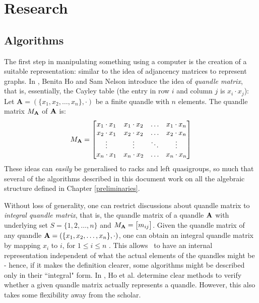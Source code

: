 \chapter{Research}\label{research}
\section{Algorithms}
\noindent The first step in manipulating something using a computer is the creation of a suitable representation: similar to the idea of adjancency matrices to represent graphs. In \cite{ho2005matrices}, Benita Ho and Sam Nelson introduce the idea of \emph{quandle matrix}, that is, essentially, the Cayley table (the entry in row $i$ and column $j$ is $x_i \cdot x_j$):
Let $\mathbf{A}=(\{x_1, x_2, \dots, x_n\}, \cdot)$ be a finite quandle with $n$ elements. \newline 
    The quandle matrix $M_\mathbf{A}$ of $\mathbf{A}$ is:
    \[M_\mathbf{A} = \begin{bmatrix}
 x_1 \cdot x_1 & x_1 \cdot x_2 & \dots & x_1 \cdot x_n \\
 x_2 \cdot x_1 & x_2 \cdot x_2 & \dots & x_2 \cdot x_n\\
 \vdots & \vdots & \ddots & \vdots \\
 x_n \cdot x_1 & x_n \cdot x_2 & \dots & x_n \cdot x_n
\end{bmatrix}\]
These ideas can \emph{easily} be generalised to racks and left quasigroups, so much that several of the algorithms described in this document work on all the algebraic structure defined in Chapter \ref{preliminaries}.\newline

 Without loss of generality, one can restrict discussions about quandle matrix to \emph{integral quandle matrix}, that is, the quandle matrix of a quandle $\mathbf{A}$ with underlying set $S =\{1,2,\dots,n\}$ and $M_\mathbf{A} = \begin{bmatrix} m_{ij}\end{bmatrix}$. Given the quandle matrix of any quandle $\mathbf{A}=(\{x_1, x_2, \dots, x_n\}, \cdot)$, one can obtain an integral quandle matrix by mapping $x_i$ to $i$, for $1 \leq i \leq n$ \cite{ho2005matrices}. This allows \Software~to have an internal representation independent of what the actual elements of the quandles might be - hence, if it makes the definition clearer, some algorithms might be described only in their ``integral" form. In \cite{ho2005matrices}, Ho et al. determine clear methods to verify whether a given quandle matrix actually represents a quandle. However, this also takes some flexibility away from the scholar.\newline

